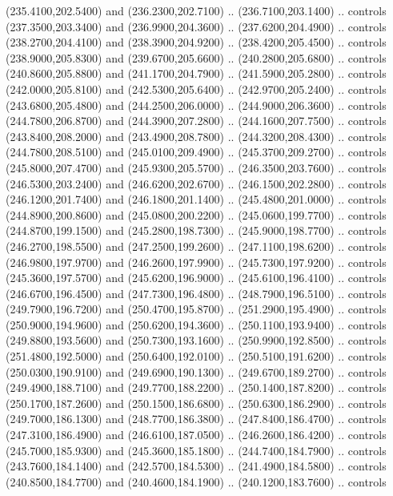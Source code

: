 {\begin{scope}[y=0.80pt, x=0.80pt, yscale=-1, xscale=1, inner sep=0pt, outer sep=0pt, #1]
      (235.4100,202.5400) and (236.2300,202.7100) .. (236.7100,203.1400) .. controls
      (237.3500,203.3400) and (236.9900,204.3600) .. (237.6200,204.4900) .. controls
      (238.2700,204.4100) and (238.3900,204.9200) .. (238.4200,205.4500) .. controls
      (238.9000,205.8300) and (239.6700,205.6600) .. (240.2800,205.6800) .. controls
      (240.8600,205.8800) and (241.1700,204.7900) .. (241.5900,205.2800) .. controls
      (242.0000,205.8100) and (242.5300,205.6400) .. (242.9700,205.2400) .. controls
      (243.6800,205.4800) and (244.2500,206.0000) .. (244.9000,206.3600) .. controls
      (244.7800,206.8700) and (244.3900,207.2800) .. (244.1600,207.7500) .. controls
      (243.8400,208.2000) and (243.4900,208.7800) .. (244.3200,208.4300) .. controls
      (244.7800,208.5100) and (245.0100,209.4900) .. (245.3700,209.2700) .. controls
      (245.8000,207.4700) and (245.9300,205.5700) .. (246.3500,203.7600) .. controls
      (246.5300,203.2400) and (246.6200,202.6700) .. (246.1500,202.2800) .. controls
      (246.1200,201.7400) and (246.1800,201.1400) .. (245.4800,201.0000) .. controls
      (244.8900,200.8600) and (245.0800,200.2200) .. (245.0600,199.7700) .. controls
      (244.8700,199.1500) and (245.2800,198.7300) .. (245.9000,198.7700) .. controls
      (246.2700,198.5500) and (247.2500,199.2600) .. (247.1100,198.6200) .. controls
      (246.9800,197.9700) and (246.2600,197.9900) .. (245.7300,197.9200) .. controls
      (245.3600,197.5700) and (245.6200,196.9000) .. (245.6100,196.4100) .. controls
      (246.6700,196.4500) and (247.7300,196.4800) .. (248.7900,196.5100) .. controls
      (249.7900,196.7200) and (250.4700,195.8700) .. (251.2900,195.4900) .. controls
      (250.9000,194.9600) and (250.6200,194.3600) .. (250.1100,193.9400) .. controls
      (249.8800,193.5600) and (250.7300,193.1600) .. (250.9900,192.8500) .. controls
      (251.4800,192.5000) and (250.6400,192.0100) .. (250.5100,191.6200) .. controls
      (250.0300,190.9100) and (249.6900,190.1300) .. (249.6700,189.2700) .. controls
      (249.4900,188.7100) and (249.7700,188.2200) .. (250.1400,187.8200) .. controls
      (250.1700,187.2600) and (250.1500,186.6800) .. (250.6300,186.2900) .. controls
      (249.7000,186.1300) and (248.7700,186.3800) .. (247.8400,186.4700) .. controls
      (247.3100,186.4900) and (246.6100,187.0500) .. (246.2600,186.4200) .. controls
      (245.7000,185.9300) and (245.3600,185.1800) .. (244.7400,184.7900) .. controls
      (243.7600,184.1400) and (242.5700,184.5300) .. (241.4900,184.5800) .. controls
      (240.8500,184.7700) and (240.4600,184.1900) .. (240.1200,183.7600) .. controls

\end{scope}}
